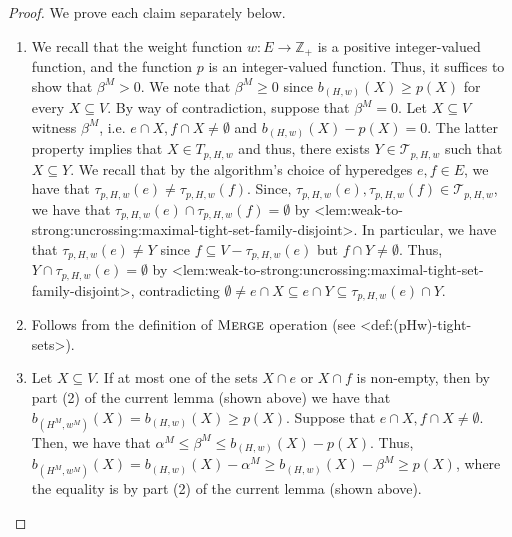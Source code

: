 \documentclass{article}
\def\Cref#1{<#1>}%
\newcommand{\maximalTightSetFamily}[1]{\ensuremath{\calT_{#1}}\xspace}
\newcommand{\tightSetFamily}[1]{\ensuremath{T_{#1}}\xspace}
\newcommand{\maximalTightSetContainingHyperedge}[1]{\ensuremath{\tau_{#1}}\xspace}
\newcommand{\merge}{\ensuremath{\textsc{Merge}}\xspace}
\providecommand{\Z}{\mathbb{Z}}
\providecommand{\calT}{\mathcal{T}}
\begin{document}
\begin{proof} We prove each claim separately below.
\begin{enumerate}
    \item We recall that the weight function $w:E\rightarrow\Z_+$ is a positive integer-valued function, and the function $p$ is an integer-valued function. Thus, it suffices to show that $\beta^M > 0$. We note that $\beta^M \geq 0$ since $b_{(H,w)}(X) \ge p(X)$ for every $X \subseteq V$. By way of contradiction, suppose that $\beta^M = 0$. Let $X \subseteq V$ witness $\beta^M$, i.e. $e \cap X, f\cap X \not = \emptyset$ and $b_{(H,w)}(X) -p(X)= 0$.
    The latter property implies that $X \in \tightSetFamily{p, H, w}$ and thus, there exists $Y \in \maximalTightSetFamily{p, H, w}$ such that $X \subseteq Y$. 
    We recall that by the algorithm's choice of hyperedges $e, f \in E$, we have that $\maximalTightSetContainingHyperedge{p, H, w}(e) \not = \maximalTightSetContainingHyperedge{p, H, w}(f)$. Since, $\maximalTightSetContainingHyperedge{p, H, w}(e), \maximalTightSetContainingHyperedge{p, H, w}(f) \in \maximalTightSetFamily{p, H, w}$, we have that $\maximalTightSetContainingHyperedge{p, H, w}(e) \cap \maximalTightSetContainingHyperedge{p, H, w}(f) = \emptyset$ by \Cref{lem:weak-to-strong:uncrossing:maximal-tight-set-family-disjoint}. In particular, we have that $\maximalTightSetContainingHyperedge{p, H, w}(e) \not = Y$ since
    $f \subseteq V - \maximalTightSetContainingHyperedge{p, H, w}(e)$ but $f \cap Y \not = \emptyset$.
    Thus, $Y\cap \maximalTightSetContainingHyperedge{p, H, w}(e) = \emptyset$ by \Cref{lem:weak-to-strong:uncrossing:maximal-tight-set-family-disjoint}, contradicting $\emptyset\neq e\cap X\subseteq e \cap Y \subseteq \maximalTightSetContainingHyperedge{p, H, w}(e)\cap Y$. 

    \item Follows from the definition of \merge operation (see \Cref{def:(pHw)-tight-sets}).
    
    \item 
    Let $X \subseteq V$. If at most one of the sets $X\cap e$ or $X\cap f$ is non-empty, then by part (2) of the current lemma (shown above) we have that $b_{(H^M, w^M)}(X) = b_{(H,w)}(X) \geq p(X)$. Suppose that $e\cap X, f\cap X \not = \emptyset$. Then, we have that $\alpha^M \leq \beta^M \leq b_{(H,w)}(X) - p(X)$.
    Thus,  
    $b_{(H^M, w^M)}(X) = b_{(H,w)}(X) - \alpha^M \geq b_{(H,w)}(X) - \beta^M \geq p(X)$, where the equality is by part (2) of the current lemma (shown above).


\end{enumerate}
\end{proof}
\end{document}
